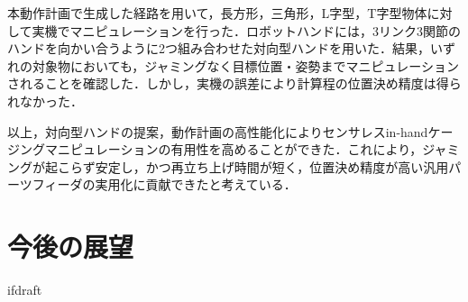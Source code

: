 \documentclass[a4paper,twoside,12pt,papersize, dvipdfmx]{iirthesis}
\begin{document}
本動作計画で生成した経路を用いて，長方形，三角形，L字型，T字型物体に対して実機でマニピュレーションを行った．ロボットハンドには，3リンク3関節のハンドを向かい合うように2つ組み合わせた対向型ハンドを用いた．結果，いずれの対象物においても，ジャミングなく目標位置・姿勢までマニピュレーションされることを確認した．しかし，実機の誤差により計算程の位置決め精度は得られなかった．

以上，対向型ハンドの提案，動作計画の高性能化によりセンサレスin-handケージングマニピュレーションの有用性を高めることができた．これにより，ジャミングが起こらず安定し，かつ再立ち上げ時間が短く，位置決め精度が高い汎用パーツフィーダの実用化に貢献できたと考えている．

\section{今後の展望}\label{sec::conclusion::future}



\expandafter\ifx\csname ifdraft\endcsname\relax
    
\end{document}
